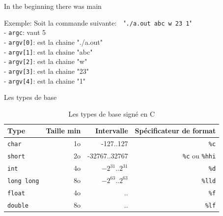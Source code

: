 \documentclass{beamer}
\begin{document}
\begin{darkframes}
  	\begin{frame}{In the beginning there was main}
	  	\begin{exampleblock}{Exemple:}
	  		Soit la commande suivante:~~"\texttt{./a.out abc w 23 1}" \\
	  		- \texttt{argc}: vaut 5 \\
	  		- \texttt{argv[0]}: est la chaine "./a.out" \\
	  		- \texttt{argv[1]}: est la chaine "abc" \\
	  		- \texttt{argv[2]}: est la chaine "w" \\
	  		- \texttt{argv[3]}: est la chaine "23" \\
	  		- \texttt{argv[4]}: est la chaine "1" \\
	  	\end{exampleblock}
  	\end{frame}
  
  	\begin{frame}{Les types de base}
  		\begin{table}[!b]
  			{\carlitoTLF %
  			\begin{tabularx}{\textwidth}{Xrrr}
  				\textbf{Type} & \textbf{Taille min} & \textbf{Intervalle} & \textbf{Spécificateur de format} \\
  				\toprule
  				\texttt{char}      & 1o  & -127..127  		   & \texttt{\%c}    				    \\
  				\texttt{short}     & 2o  & -32767..32767  	   & \texttt{\%c} ou \texttt{\%hhi}     \\
  				\texttt{int}       & 4o  & $-2^{31}$..$2^{31}$ & \texttt{\%d}    				    \\
  				\texttt{long long} & 8o  & $-2^{63}$..$2^{63}$ & \texttt{\%lld}  				    \\
  				\texttt{float}     & 4o  &    ..    		   & \texttt{\%f}    				    \\
  				\texttt{double}    & 8o  &    ..   			   & \texttt{\%lf}   					\\
  				\bottomrule
  			\end{tabularx}}
  			\caption{Les types de base signé en C}
  		\end{table}
  	\end{frame}
  

\end{darkframes}
\end{document}
